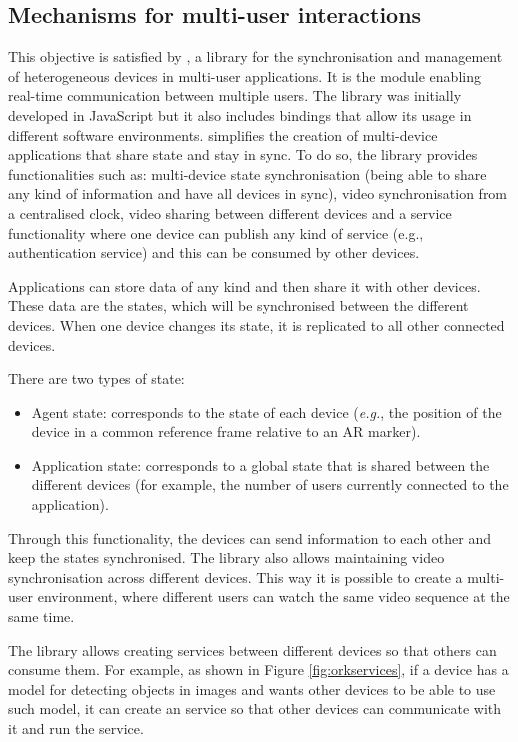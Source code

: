 \subsection{Mechanisms for multi-user interactions}\label{sec:architecture:multiuser}

This objective is satisfied by \ork{} \citep{10.1007/978-3-030-93907-6_106}, a library for the synchronisation and management of heterogeneous devices in multi-user applications. It is the module enabling real-time communication between multiple users. The library was initially developed in JavaScript but it also includes bindings that allow its usage in different software environments.
\ork{} simplifies the creation of multi-device applications that share state and stay in sync. To do so, the library provides functionalities such as: multi-device state synchronisation (being able to share any kind of information and have all devices in sync), video synchronisation from a centralised clock, video sharing between different devices and a service functionality where one device can publish any kind of service (e.g., authentication service) and this can be consumed by other devices.

Applications can store data of any kind and then share it with other devices. These data are the states, which will be synchronised between the different devices. When one device changes its state, it is replicated to all other connected devices.

There are two types of state:
\begin{itemize}
    \item Agent state: corresponds to the state of each device (\textit{e.g.}, the position of the device in a common reference frame relative to an AR marker).
    \item Application state: corresponds to a global state that is shared between the different devices (for example, the number of users currently connected to the application).
\end{itemize}

Through this functionality, the devices can send information to each other and keep the states synchronised. The library also allows maintaining video  synchronisation across different devices. This way it is possible to create a multi-user environment, where different users can watch the same video sequence at the same time. 

The library allows creating services between different devices so that others can consume them. For example, as shown in Figure \ref{fig:orkservices}, if a device has a model for detecting objects in images and wants other devices to be able to use such model, it can create an \ork{} service so that other devices can communicate with it and run the service.

